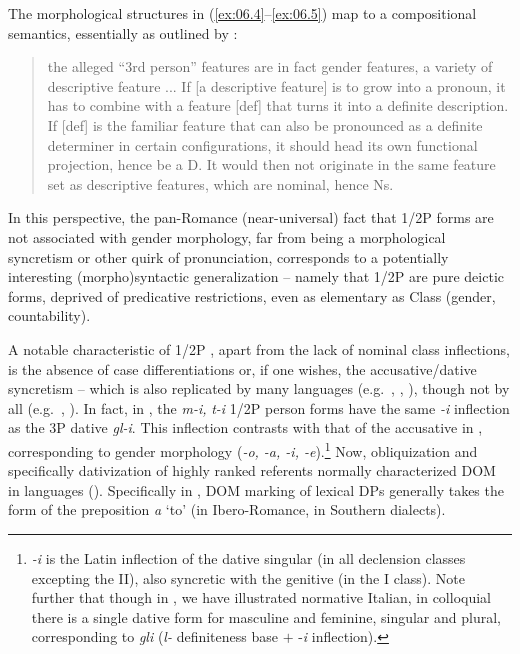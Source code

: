 \documentclass[output=paper]{langsci/langscibook}
\begin{document}
The morphological structures in (\ref{ex:06.4}--\ref{ex:06.5}) map to a
compositional semantics, essentially as outlined by \citet[221]{Kratzer2009}:

\begin{quote}
the alleged “3rd person” features are in fact gender features, a variety of
descriptive feature ... If [a descriptive feature] is to grow into a pronoun,
it has to combine with a feature [def] that turns it into a definite
description. If [def] is the familiar feature that can also be pronounced as a
definite determiner in certain configurations, it should head its own
functional projection, hence be a D. It would then not originate in the same
feature set as descriptive features, which are nominal, hence Ns.
\end{quote}

\noindent In this
perspective, the pan-Romance (near-universal) fact that 1/2P forms are not
associated with gender morphology, far from being a morphological syncretism or
other quirk of pronunciation, corresponds to a potentially interesting
\mbox{(morpho)}syntactic generalization – namely that 1/2P are pure deictic forms,
deprived of predicative restrictions, even as elementary as Class (gender,
countability).

A notable characteristic of  1/2P , apart from the lack of
nominal class inflections, is the absence of case differentiations or, if one
wishes, the accusative/dative syncretism – which is also replicated by many
languages (e.g.\ , , ), though not by all (e.g.\ ,
). In fact, in  , the \emph{m-i,} \emph{t-i} 1/2P
person forms have the same \emph{-i} inflection as the 3P dative \emph{gl-i}.
This inflection contrasts with that of the accusative in ,
corresponding to gender morphology (\emph{-o, -a, -i, -e}).\footnote{\emph{-i}
    is the Latin inflection of the dative singular (in all declension classes
    excepting the II), also syncretic with the genitive (in the I class).  Note
    further that though in , we have illustrated normative
Italian, in colloquial  there is a single dative form for masculine and
feminine, singular and plural, corresponding to \emph{gli} (\emph{l-}
definiteness base $+$ -\emph{i} inflection).} Now, obliquization and specifically
dativization of highly ranked referents normally characterized \gls{DOM} in
 languages (\citealt{ManFra2016}).  Specifically in ,
\gls{DOM} marking of lexical DPs generally takes the form of the preposition
\emph{a} ‘to’ (in Ibero-Romance, in Southern 
dialects).
\end{document}
